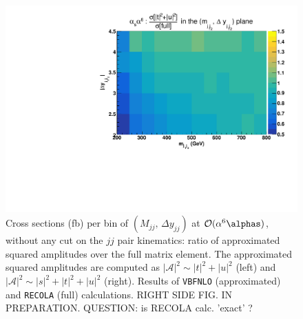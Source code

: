 \begin{figure}[hbt]
\centering
\includegraphics[scale=0.395]{figures/scanfigures/a6as_vbfnloVSrecola_tu.pdf}
\caption{Cross sections (fb) per bin of $(M_{jj},\,\Delta y_{jj})$ at $\mathcal{O}(\alpha^6\alphas)$, without any cut on the $jj$ pair kinematics: ratio of approximated squared amplitudes over the full matrix element. The approximated squared amplitudes are computed as $|\mathcal{A}|^2 \sim |t|^2 + |u|^2$ (left) and $|\mathcal{A}|^2 \sim |s|^2 + |t|^2 + |u|^2$ (right). Results of \texttt{VBFNLO} (approximated) and \texttt{RECOLA} (full) calculations. RIGHT SIDE FIG. IN PREPARATION. QUESTION: is RECOLA calc. 'exact' ?}\label{fig:ratio2d_NLO}
\end{figure}
